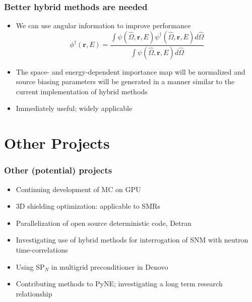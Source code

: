 \documentclass[xcolor=x11names,compress]{beamer}
\renewcommand{\(}{\begin{columns}}
\renewcommand{\)}{\end{columns}}
\newcommand{\<}[1]{\begin{column}{#1}}
\renewcommand{\>}{\end{column}}
\newcommand{\vOmega}{\ensuremath{\hat{\Omega}}}
\newcommand{\ve}[1]{\ensuremath{\mathbf{#1}}}
\begin{document}
\begin{frame}[fragile]
  \frametitle{Better hybrid methods are needed}

	\begin{itemize}
	\item We can use angular information to improve performance
		\begin{equation}
		\phi^{\dagger}(\ve{r},E) = \frac{\int \psi(\vOmega, \ve{r},E) \psi^{\dagger}(\vOmega, \ve{r},E) d\vOmega}{\int \psi(\vOmega, \ve{r},E)  d\vOmega}
		\end{equation}

	\item The space- and energy-dependent importance map will be normalized and source biasing parameters will be generated in a manner similar to the current implementation of hybrid methods
	\item Immediately useful; widely applicable
	\end{itemize}

\end{frame}



\section{Other Projects}
\begin{frame}[fragile]
  \frametitle{Other (potential) projects}

  	\begin{itemize}
  	\item Continuing development of MC on GPU
	\item 3D shielding optimization: applicable to SMRs 
	\item Parallelization of open source deterministic code, Detran 
	\item Investigating use of hybrid methods for interrogation of SNM with neutron time-correlations 
	\item Using SP$_N$ in multigrid preconditioner in Denovo 
	\item Contributing methods to PyNE; investigating a long term research relationship
	\end{itemize}
	
\end{frame}


\end{document}
